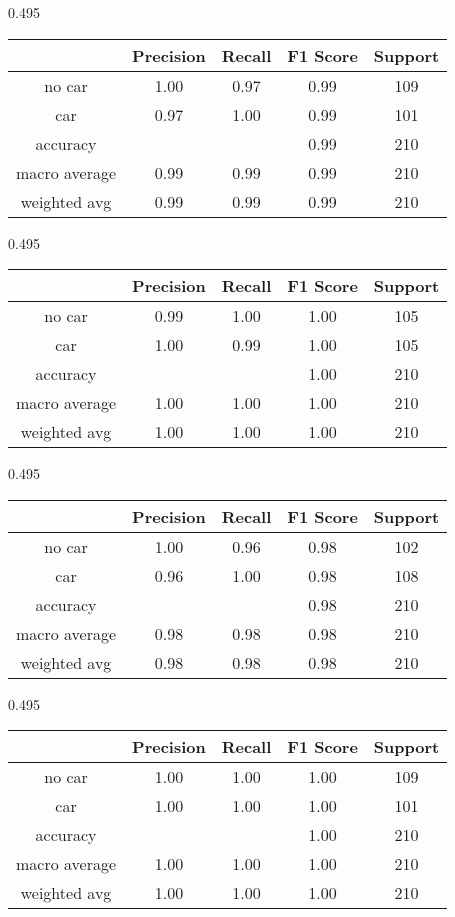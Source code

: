 \begin{table*}[!ht]
	\centering
	\caption{分类器训练测试结果表}
	\begin{subtable}[t]{0.495\linewidth}
	\caption{Logistic 回归}
	\begin{tabular}{c|cccc}
		\toprule
		& Precision&Recall & F1 Score &Support\\\hline
		no car&1.00&0.97&0.99&109\\
		car &0.97&1.00&0.99&101\\\hline
		accuracy&&&0.99&210\\ 
		macro average &0.99&0.99&0.99&210\\
		weighted avg&0.99&0.99&0.99&210\\
		\bottomrule
	\end{tabular}
	\end{subtable}
	\begin{subtable}[t]{0.495\linewidth}
	\caption{支持向量机}
	\begin{tabular}{c|cccc}
		\toprule
		& Precision&Recall & F1 Score &Support\\\hline
		no car&0.99&1.00&1.00&105\\
		car &1.00&0.99&1.00&105\\\hline
		accuracy&&&1.00&210\\ 
		macro average &1.00&1.00&1.00&210\\
		weighted avg&1.00&1.00&1.00&210\\
		\bottomrule
	\end{tabular}
	\end{subtable}

	\begin{subtable}[t]{0.495\linewidth}
	\caption{AdaBoost}
	\begin{tabular}{c|cccc}
		\toprule
		& Precision&Recall & F1 Score &Support\\\hline
		no car&1.00&0.96&0.98&102\\
		car &0.96&1.00&0.98&108\\\hline
		accuracy&&&0.98&210\\ 
		macro average &0.98&0.98&0.98&210\\
		weighted avg&0.98&0.98&0.98&210\\
		\bottomrule
	\end{tabular}
	\end{subtable}
	\begin{subtable}[t]{0.495\linewidth}
	\caption{AdaBoost$^*$}
		\begin{tabular}{c|cccc}
		\toprule
		& Precision&Recall & F1 Score &Support\\\hline
		no car&1.00&1.00&1.00&109\\
		car &1.00&1.00&1.00&101\\\hline
		accuracy&&&1.00&210\\ 
		macro average &1.00&1.00&1.00&210\\
		weighted avg&1.00&1.00&1.00&210\\
		\bottomrule
	\end{tabular}
	\end{subtable}
	\label{tab:class_result}
\end{table*}

